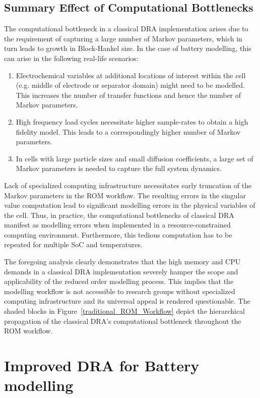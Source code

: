 \subsection{Summary Effect of Computational Bottlenecks\label{subsec:Summary-Effect-of}}

The computational bottleneck in a classical DRA implementation arises
due to the requirement of capturing a large number of Markov parameters,
which in turn leads to growth in Block-Hankel size. In the case of
battery modelling, this can arise in the following real-life scenarios:
\begin{enumerate}
	\item Electrochemical variables at additional locations of interest within
	the cell (e.g. middle of electrode or separator domain) might need
	to be modelled. This increases the number of transfer functions and
	hence the number of Markov parameters.
	\item High frequency load cycles necessitate higher sample-rates to obtain
	a high fidelity model. This leads to a correspondingly higher number
	of Markov parameters.
	\item In cells with large particle sizes and small diffusion coefficients,
	a large set of Markov parameters is needed to capture the full system
	dynamics.
\end{enumerate}
Lack of specialized computing infrastructure necessitates early truncation
of the Markov parameters in the ROM workflow. The resulting errors
in the singular value computation lead to significant modelling errors
in the physical variables of the cell. Thus, in practice, the computational
bottlenecks of classical DRA manifest as modelling errors when implemented
in a resource-constrained computing environment. Furthermore, this
tedious computation has to be repeated for multiple SoC and temperatures.

The foregoing analysis clearly demonstrates that the high memory and
CPU demands in a classical DRA implementation severely hamper the
scope and applicability of the reduced order modelling process. This
implies that the modelling workflow is not accessible to research groups
without specialized computing infrastructure and its universal appeal
is rendered questionable. The shaded blocks in Figure~\ref{traditional_ROM_Workflow}
depict the hierarchical propagation of the classical DRA's computational
bottleneck throughout the ROM workflow.

\section{Improved DRA for Battery modelling \label{sec:Efficient-Computation-of}}

